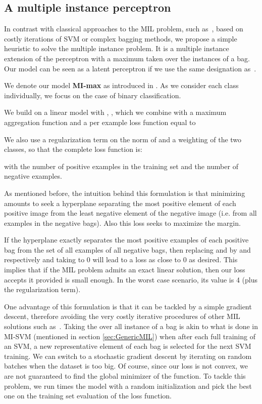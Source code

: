 \documentclass[preprint]{elsarticle}
\newcommand\MILS{MI-max}
\begin{document}
\subsection{A multiple instance perceptron}
\label{sec:MainModel} 

In contrast with classical approaches to the MIL problem, such as~\citep{andrews_support_2003,carbonneau_robust_2016}, based on costly iterations of SVM or complex bagging methods, we propose a simple heuristic to solve the multiple instance problem.
It is a multiple instance extension of the perceptron  \citep{rosenblatt_perceptron_1958} with a maximum taken over the instances of a bag. Our model can be seen as a latent perceptron if we use the same designation as~\citep{felzenszwalb_object_2010}.


We denote our model {\bf \MILS{}} as introduced in \citep{gonthier_weakly_2018}. 
As we consider each class individually, we focus on the case of binary classification.



We build on a linear model  with , , which we combine with a maximum aggregation function  and a per example loss function equal to 

We also use a regularization term on the norm of  and a weighting of the two classes, so that the complete loss function is: 


with  the number of positive examples in the training set and  the number of negative examples.

As mentioned before, the intuition behind this formulation is that minimizing  amounts to seek a hyperplane separating the most positive element of each positive image from the least negative element of the negative image (i.e. from all examples in the negative bags). Also this loss seeks to maximize the margin. 
 

 If the hyperplane   exactly separates the most positive examples of each positive bag from the set of all examples of all negative bags, then replacing  and  by  and  respectively and taking  to 0 will lead to a loss as close to 0 as desired. This implies that if the MIL problem admits an exact linear solution, then our loss accepts it provided  is small enough. 
 In the worst case scenario, its value is 4 (plus the regularization term).

 One advantage of this formulation is that it can be tackled by a simple gradient descent, therefore avoiding the very costly iterative procedures of other MIL solutions such as~\citep{andrews_support_2003}. Taking the  over all instance of a bag is akin to what is done in MI-SVM (mentioned in section \ref{sec:GenericMIL}) when after each full training of an SVM, a new representative element of each bag is selected for the next SVM training.
We can switch to a stochastic gradient descent by iterating on random batches when the dataset is too big.  Of course, since our loss is not convex, we are not guaranteed to find the global minimizer of the function. To tackle this problem, we run  times the model with a random initialization and pick the best one on the training set evaluation of the loss function. 
\end{document}
